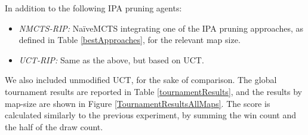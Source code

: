 \documentclass[conference]{IEEEtran}
\begin{document}
In addition to the following IPA pruning agents:

\begin{itemize}
\item \textit{NMCTS-RIP:} NaïveMCTS integrating one of the IPA pruning approaches, as defined in Table \ref{bestApproaches}, for the relevant map size.
\item \textit{UCT-RIP:} Same as the above, but based on UCT.
\end{itemize}

We also included unmodified UCT, for the sake of comparison. The global tournament results are reported in Table \ref{tournamentResults}, and the results by map-size are shown in Figure \ref{TournamentResultsAllMaps}. The score is calculated similarly to the previous experiment, by summing the win count and the half of the draw count.
\end{document}

